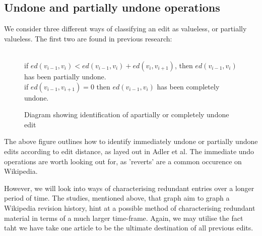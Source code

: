 \documentclass[a4paper,11pt,twoside,notitlepage]{article}
\begin{document}
        \subsection*{Undone and partially undone operations}
        We consider three different ways of classifying an edit as
        valueless, or partially valueless. The first two are found in
        previous research:

        \begin{figure}[h!]
          \centering
          \\
          if $ed(v_{i-1},v_i) < ed(v_{i-1},v_i) + ed(v_{i},v_{i+1})$,
          then $ed(v_{i-1},v_i)$ has been partially undone.\\ if
          $ed(v_{i-1},v_{i+1}) = 0$ then $ed(v_{i-1},v_i)$ has been
          completely undone.
          \caption{Diagram showing identification of apartially or
            completely undone edit}
          \label{fig:undo}
        \end{figure}

        The above figure outlines how to identify immediately undone
        or partially undone edits according to edit distance, as layed
        out in Adler et al\cite{Adler2007}. The immediate undo
        operations are worth looking out for, as 'reverts' are a
        common occurence on Wikipedia.

        However, we will look into ways of characterising redundant
        entries over a longer period of time. The studies, mentioned
        above, that graph aim to graph a Wikipedia revision history,
        hint at a possible method of characterising redundant material
        in terms of a much larger time-frame. Again, we may utilise
        the fact taht we have take one article to be the ultimate
        destination of all previous edits. 
\end{document}
